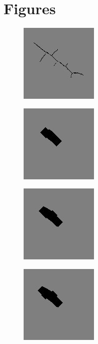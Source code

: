 \documentclass{article}
\begin{document}
\section{Figures}

\begin{figure}[h]
\caption{}
\centering
\includegraphics{images/skeleton.jpg}
\end{figure}

\begin{figure}[h]
\caption{}
\centering
\includegraphics{images/rebuilt_image10.jpg}
\end{figure}

\begin{figure}[h]
\caption{}
\centering
\includegraphics{images/rebuilt_image9.jpg}
\end{figure}

\begin{figure}[h]
\caption{}
\centering
\includegraphics{images/rebuilt_image8.jpg}
\end{figure}
\end{document}

